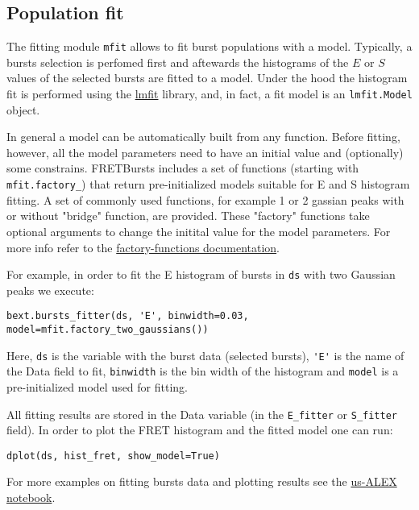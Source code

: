 
\subsection{Population fit}

The fitting module \verb|mfit| allows to fit burst populations with a model. Typically, a bursts selection is perfomed first and aftewards the histograms of the $E$ or $S$ values of the selected bursts are fitted to a model. Under the hood the histogram fit is performed using the \href{http://lmfit.github.io/lmfit-py/}{lmfit} library, and, in fact, 
a fit model is an \verb|lmfit.Model| object.

In general a model can be automatically built from any function. Before fitting, however, all the model parameters need to have an initial value and (optionally) some constrains. FRETBursts includes a set of functions (starting with \verb|mfit.factory_|) that return pre-initialized models suitable for E and S histogram fitting. A set of commonly used functions, for example 1 or 2 gassian peaks with or without "bridge" function, are provided. These "factory" functions take optional arguments to change the initital value for the model parameters. For more info refer to the
\href{http://fretbursts.readthedocs.org/en/latest/mfit.html#model-factory-functions}{factory-functions documentation}.

For example, in order to fit the E histogram of bursts in \verb|ds| with two Gaussian peaks we execute:

\begin{verbatim}
bext.bursts_fitter(ds, 'E', binwidth=0.03, model=mfit.factory_two_gaussians())
\end{verbatim}

Here, \verb|ds| is the variable with the burst data (selected bursts), \verb|'E'| is the name of the Data field to fit, \verb|binwidth| is the bin width of the histogram and \verb|model| is a pre-initialized model used for fitting.

All fitting results are stored in the Data variable (in the \verb|E_fitter| or \verb|S_fitter| field).
In order to plot the FRET histogram and the fitted model one can run:

\begin{verbatim}
dplot(ds, hist_fret, show_model=True)
\end{verbatim}

For more examples on fitting bursts data and plotting results see the \href{http://nbviewer.ipython.org/urls/raw.github.com/tritemio/FRETBursts_notebooks/master/notebooks/FRETBursts\%2520-\%2520us-ALEX\%2520smFRET\%2520burst\%2520analysis.ipynb}{us-ALEX notebook}.

